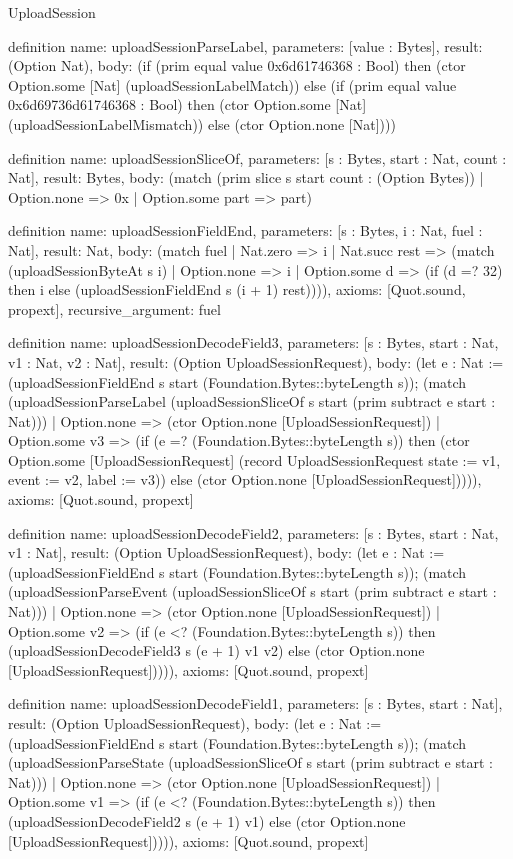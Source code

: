 \begin{lexlean}{UploadSession}
\begin{semanticmodule}
definition{
  name: uploadSessionParseLabel,
  parameters: [value : Bytes],
  result: (Option Nat),
  body: (if (prim equal value 0x6d61746368 : Bool) then (ctor Option.some [Nat] (uploadSessionLabelMatch)) else (if (prim equal value 0x6d69736d61746368 : Bool) then (ctor Option.some [Nat] (uploadSessionLabelMismatch)) else (ctor Option.none [Nat])))
}

definition{
  name: uploadSessionSliceOf,
  parameters: [s : Bytes, start : Nat, count : Nat],
  result: Bytes,
  body: (match (prim slice s start count : (Option Bytes))
    | Option.none => 0x
    | Option.some part => part)
}

definition{
  name: uploadSessionFieldEnd,
  parameters: [s : Bytes, i : Nat, fuel : Nat],
  result: Nat,
  body: (match fuel
    | Nat.zero => i
    | Nat.succ rest => (match (uploadSessionByteAt s i)
      | Option.none => i
      | Option.some d => (if (d =? 32) then i else (uploadSessionFieldEnd s (i + 1) rest)))),
  axioms: [Quot.sound, propext],
  recursive_argument: fuel
}

definition{
  name: uploadSessionDecodeField3,
  parameters: [s : Bytes, start : Nat, v1 : Nat, v2 : Nat],
  result: (Option UploadSessionRequest),
  body: (let e : Nat := (uploadSessionFieldEnd s start (Foundation.Bytes::byteLength s)); (match (uploadSessionParseLabel (uploadSessionSliceOf s start (prim subtract e start : Nat)))
    | Option.none => (ctor Option.none [UploadSessionRequest])
    | Option.some v3 => (if (e =? (Foundation.Bytes::byteLength s)) then (ctor Option.some [UploadSessionRequest] (record UploadSessionRequest {state := v1, event := v2, label := v3})) else (ctor Option.none [UploadSessionRequest])))),
  axioms: [Quot.sound, propext]
}

definition{
  name: uploadSessionDecodeField2,
  parameters: [s : Bytes, start : Nat, v1 : Nat],
  result: (Option UploadSessionRequest),
  body: (let e : Nat := (uploadSessionFieldEnd s start (Foundation.Bytes::byteLength s)); (match (uploadSessionParseEvent (uploadSessionSliceOf s start (prim subtract e start : Nat)))
    | Option.none => (ctor Option.none [UploadSessionRequest])
    | Option.some v2 => (if (e <? (Foundation.Bytes::byteLength s)) then (uploadSessionDecodeField3 s (e + 1) v1 v2) else (ctor Option.none [UploadSessionRequest])))),
  axioms: [Quot.sound, propext]
}

definition{
  name: uploadSessionDecodeField1,
  parameters: [s : Bytes, start : Nat],
  result: (Option UploadSessionRequest),
  body: (let e : Nat := (uploadSessionFieldEnd s start (Foundation.Bytes::byteLength s)); (match (uploadSessionParseState (uploadSessionSliceOf s start (prim subtract e start : Nat)))
    | Option.none => (ctor Option.none [UploadSessionRequest])
    | Option.some v1 => (if (e <? (Foundation.Bytes::byteLength s)) then (uploadSessionDecodeField2 s (e + 1) v1) else (ctor Option.none [UploadSessionRequest])))),
  axioms: [Quot.sound, propext]
}


\end{semanticmodule}
\end{lexlean}
